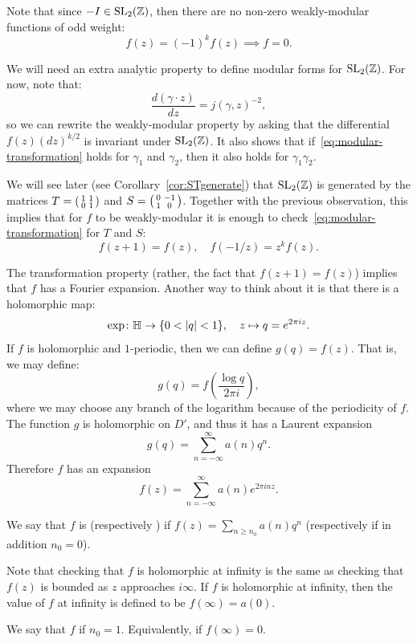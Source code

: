 Note that since $-I\in\operatorname{SL}_2(\mathbb{Z})$, then there are no non-zero weakly-modular functions of odd weight:
\[
f(z)=(-1)^kf(z)\implies f=0.
\]

We will need an extra analytic property to define modular forms for $\operatorname{SL}_2(\mathbb{Z})$. For now, note that:
\[
\frac{d(\gamma\cdot z)}{dz} = j(\gamma,z)^{-2},
\]
so we can rewrite the weakly-modular property by asking that the differential $f(z)(dz)^{k/2}$ is invariant under $\operatorname{SL}_2(\mathbb{Z})$. It also shows that if~\eqref{eq:modular-transformation} holds for $\gamma_1$ and $\gamma_2$, then it also holds for $\gamma_1\gamma_2$.

We will see later (see Corollary~\ref{cor:STgenerate}) that $\operatorname{SL}_2(\mathbb{Z})$ is generated by the matrices $T=\left(\begin{smallmatrix}1&1\\0&1\end{smallmatrix}\right)$ and $S=\left(\begin{smallmatrix}0&-1\\1&0\end{smallmatrix}\right)$. Together with the previous observation, this implies that for $f$ to be weakly-modular it is enough to check~\eqref{eq:modular-transformation} for $T$ and $S$:
\[
f(z+1)=f(z),\quad f(-1/z) = z^k f(z).
\]

The transformation property (rather, the fact that $f(z+1)=f(z)$) implies that $f$ has a Fourier expansion. Another way to think about it is that there is a holomorphic map:
\[
\exp\colon \HH\to \{0<|q|<1\},\quad z\mapsto q=e^{2\pi i z}.
\]
If $f$ is holomorphic and $1$-periodic, then we can define $g(q)=f(z)$. That is, we may define:
\[
g(q)=f\left(\frac{\log q}{2\pi i}\right),
\]
where we may choose any branch of the logarithm because of the periodicity of $f$. The function $g$ is holomorphic on $D'$, and thus it has a Laurent expansion
\[
g(q)=\sum_{n=-\infty}^\infty a(n)q^n.
\]
Therefore $f$ has an expansion
\[
f(z) = \sum_{n=-\infty}^\infty a(n)e^{2\pi i nz}.
\]
\begin{definition}
  We say that $f$ is  (respectively ) if $f(z)=\sum_{n\geq n_0} a(n)q^n$ (respectively if in addition $n_0=0$).
\end{definition}
Note that checking that $f$ is holomorphic at infinity is the same as checking that $f(z)$ is bounded as $z$ approaches $i\infty$. If $f$ is holomorphic at infinity, then the value of $f$ at infinity is defined to be $f(\infty)=a(0)$.

\begin{definition}
  We say that $f$  if $n_0=1$. Equivalently, if $f(\infty)=0$.
\end{definition}


